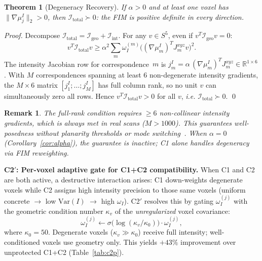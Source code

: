 \documentclass[journal,letterpaper,10pt]{IEEEtran}
\newtheorem{theorem}{Theorem}
\newtheorem{remark}{Remark}
\newcommand{\FIM}{\mathcal{I}}
\newcommand{\ie}{\textit{i.e.}}
\begin{document}
\begin{theorem}[Degeneracy Recovery]\label{thm:degeneracy}
If $\alpha > 0$ and at least one voxel has $\|\nabla\mu_j^I\|_2 > 0$,
then $\FIM_{\mathrm{total}} \succ 0$: the FIM is positive definite
in every direction.
\end{theorem}
\begin{proof}
Decompose $\FIM_{\mathrm{total}} = \FIM_{\mathrm{geo}} + \FIM_{\mathrm{int}}$.
For any $v \in S^5$, even if $v^T\FIM_{\mathrm{geo}} v = 0$:
\begin{equation*}
  v^T\FIM_{\mathrm{total}} v
  \geq \alpha^2\sum_m \omega_I^{(m)} \bigl((\nabla\mu_m^I)^T J_m^{xyz} v\bigr)^2.
\end{equation*}
The intensity Jacobian row for correspondence~$m$ is
$j_m^I = \alpha\,(\nabla\mu_m^I)^T J_m^{xyz} \in \mathbb{R}^{1\times 6}$.
With $M$ correspondences spanning at least 6 non-degenerate intensity
gradients, the $M\times 6$ matrix $[j_1^I;\ldots;j_M^I]$ has full column
rank, so no unit $v$ can simultaneously zero all rows.
Hence $v^T\FIM_{\mathrm{total}}v > 0$ for all $v$, \ie
$\FIM_{\mathrm{total}} \succ 0$.
\qed
\end{proof}

\begin{remark}
The full-rank condition requires $\geq 6$ non-collinear intensity
gradients, which is always met in real scans ($M > 1000$).
This guarantees well-posedness without planarity thresholds or mode
switching~\cite{zhang2024genz}.
When $\alpha{=}0$ (Corollary~\ref{cor:alpha}), the guarantee is
inactive; C1 alone handles degeneracy via FIM reweighting.
\end{remark}

\textbf{C2$'$: Per-voxel adaptive gate for C1+C2 compatibility.}
When C1 and C2 are both active, a destructive interaction arises:
C1 down-weights degenerate voxels while C2 assigns high intensity
precision to those same voxels (uniform concrete $\to$ low
$\mathrm{Var}(I)$ $\to$ high $\omega_I$).
C2$'$ resolves this by gating $\omega_I^{(j)}$ with the geometric
condition number $\kappa_v$ of the \emph{unregularized} voxel covariance:
\begin{equation}
  \omega_I^{(j)} \leftarrow \sigma\!\bigl(\log(\kappa_v/\kappa_0)\bigr)
  \cdot \omega_I^{(j)},
  \label{eq:c2p_gate}
\end{equation}
where $\kappa_0{=}50$.
Degenerate voxels ($\kappa_v \gg \kappa_0$) receive full intensity;
well-conditioned voxels use geometry only.
This yields $+43\%$ improvement over unprotected C1+C2
(Table~\ref{tab:c2p}).
\end{document}
